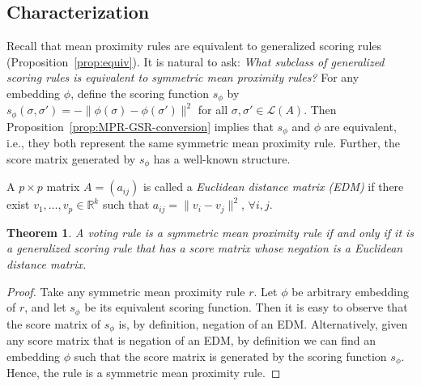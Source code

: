\documentclass[10pt,letterpaper]{article}
\newcommand{\calL}{{\mathcal{L}}}
\newcommand{\rank}{{\calL(A)}}
\DeclareMathOperator*{\argmax}{arg\,max}
\DeclareMathOperator*{\argmin}{arg\,min}
\newtheorem{theorem}{Theorem}
\newenvironment{definition}[1][Definition]{\begin{trivlist}
\item[\hskip \labelsep {\bfseries #1}]}{\end{trivlist}}
\begin{document}

\subsection{Characterization}

Recall that mean proximity rules are equivalent to generalized scoring rules (Proposition~\ref{prop:equiv}). It is natural to ask: \emph{What subclass of generalized scoring rules is equivalent to symmetric mean proximity rules?} For any embedding $\phi$, define the scoring function $s_{\phi}$ by $s_{\phi}(\sigma,\sigma') = -\|\phi(\sigma)-\phi(\sigma')\|^2$ for all $\sigma,\sigma' \in \rank$. Then Proposition~\ref{prop:MPR-GSR-conversion} implies that $s_{\phi}$ and $\phi$ are equivalent, i.e., they both represent the same symmetric mean proximity rule. Further, the score matrix generated by $s_{\phi}$ has a well-known structure.


\begin{definition}[Euclidean Distance Matrix (EDM)]
A $p \times p$ matrix $A = (a_{ij})$ is called a \emph{Euclidean distance matrix (EDM)} if there exist $v_1,\ldots,v_p \in \mathbb{R}^k$ such that $a_{ij} = \|v_i-v_j\|^2$, $\forall i,j$. 
\end{definition}

\begin{theorem}
A voting rule is a symmetric mean proximity rule if and only if it is a generalized scoring rule that has a score matrix whose negation is a Euclidean distance matrix. 
\label{thm:symm}
\end{theorem}
\begin{proof}
Take any symmetric mean proximity rule $r$. Let $\phi$ be arbitrary embedding of $r$, and let $s_{\phi}$ be its equivalent scoring function. Then it is easy to observe that the score matrix of $s_{\phi}$ is, by definition, negation of an EDM. Alternatively, given any score matrix that is negation of an EDM, by definition we can find an embedding $\phi$ such that the score matrix is generated by the scoring function $s_{\phi}$. Hence, the rule is a symmetric mean proximity rule.

\end{proof}
\end{document}

